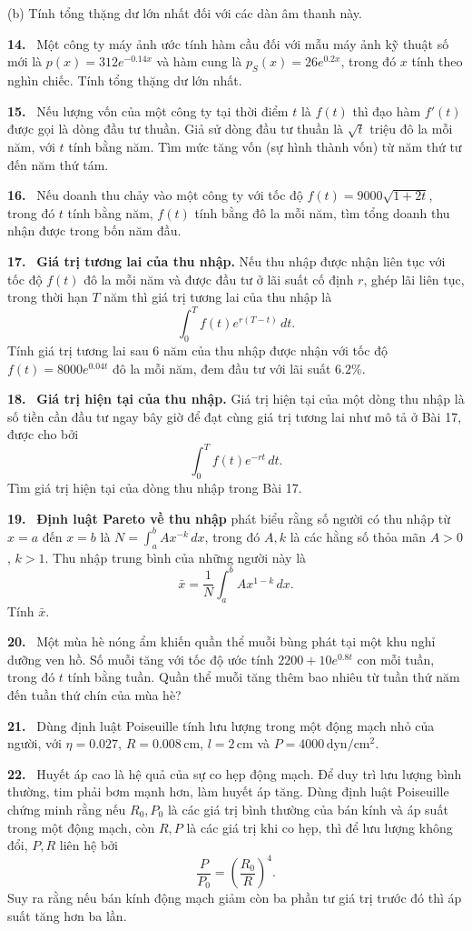 \documentclass[12pt,a4paper]{article}
\newcommand{\bt}[1]{\par\smallskip\Needspace{5\baselineskip}\noindent\textbf{#1.}\ }
\begin{document}
(b) Tính tổng thặng dư lớn nhất đối với các dàn âm thanh này.
\bt{14} Một công ty máy ảnh ước tính hàm cầu đối với mẫu máy ảnh kỹ thuật số mới là $p(x)=312e^{-0.14x}$ và hàm cung là $p_S(x)=26e^{0.2x}$, trong đó $x$ tính theo nghìn chiếc. Tính tổng thặng dư lớn nhất.
\bt{15} Nếu lượng vốn của một công ty tại thời điểm $t$ là $f(t)$ thì đạo hàm $f'(t)$ được gọi là dòng đầu tư thuần. Giả sử dòng đầu tư thuần là $\sqrt t$ triệu đô la mỗi năm, với $t$ tính bằng năm. Tìm mức tăng vốn (sự hình thành vốn) từ năm thứ tư đến năm thứ tám.
\bt{16} Nếu doanh thu chảy vào một công ty với tốc độ $f(t)=9000\sqrt{1+2t}$, trong đó $t$ tính bằng năm, $f(t)$ tính bằng đô la mỗi năm, tìm tổng doanh thu nhận được trong bốn năm đầu.
\bt{17} \textbf{Giá trị tương lai của thu nhập.} Nếu thu nhập được nhận liên tục với tốc độ $f(t)$ đô la mỗi năm và được đầu tư ở lãi suất cố định $r$, ghép lãi liên tục, trong thời hạn $T$ năm thì giá trị tương lai của thu nhập là
\[\int_{0}^{T}f(t)e^{r(T-t)}\,dt.\]
Tính giá trị tương lai sau 6 năm của thu nhập được nhận với tốc độ $f(t)=8000e^{0.04t}$ đô la mỗi năm, đem đầu tư với lãi suất $6.2\%$.
\bt{18} \textbf{Giá trị hiện tại của thu nhập.} Giá trị hiện tại của một dòng thu nhập là số tiền cần đầu tư ngay bây giờ để đạt cùng giá trị tương lai như mô tả ở Bài 17, được cho bởi
\[\int_{0}^{T}f(t)e^{-rt}\,dt.\]
Tìm giá trị hiện tại của dòng thu nhập trong Bài 17.
\bt{19} \textbf{Định luật Pareto về thu nhập} phát biểu rằng số người có thu nhập từ $x=a$ đến $x=b$ là $N=\int_a^bAx^{-k}\,dx$, trong đó $A,k$ là các hằng số thỏa mãn $A>0$, $k>1$. Thu nhập trung bình của những người này là
\[\bar x=\frac1N\int_a^bAx^{1-k}\,dx.\]
Tính $\bar x$.
\bt{20} Một mùa hè nóng ẩm khiến quần thể muỗi bùng phát tại một khu nghỉ dưỡng ven hồ. Số muỗi tăng với tốc độ ước tính $2200+10e^{0.8t}$ con mỗi tuần, trong đó $t$ tính bằng tuần. Quần thể muỗi tăng thêm bao nhiêu từ tuần thứ năm đến tuần thứ chín của mùa hè?
\bt{21} Dùng định luật Poiseuille tính lưu lượng trong một động mạch nhỏ của người, với $\eta=0.027$, $R=0.008\,\mathrm{cm}$, $l=2\,\mathrm{cm}$ và $P=4000\,\mathrm{dyn/cm^2}$.
\bt{22} Huyết áp cao là hệ quả của sự co hẹp động mạch. Để duy trì lưu lượng bình thường, tim phải bơm mạnh hơn, làm huyết áp tăng. Dùng định luật Poiseuille chứng minh rằng nếu $R_0,P_0$ là các giá trị bình thường của bán kính và áp suất trong một động mạch, còn $R,P$ là các giá trị khi co hẹp, thì để lưu lượng không đổi, $P,R$ liên hệ bởi
\[\frac P{P_0}=\left(\frac{R_0}R\right)^4.\]
Suy ra rằng nếu bán kính động mạch giảm còn ba phần tư giá trị trước đó thì áp suất tăng hơn ba lần.
\end{document}
